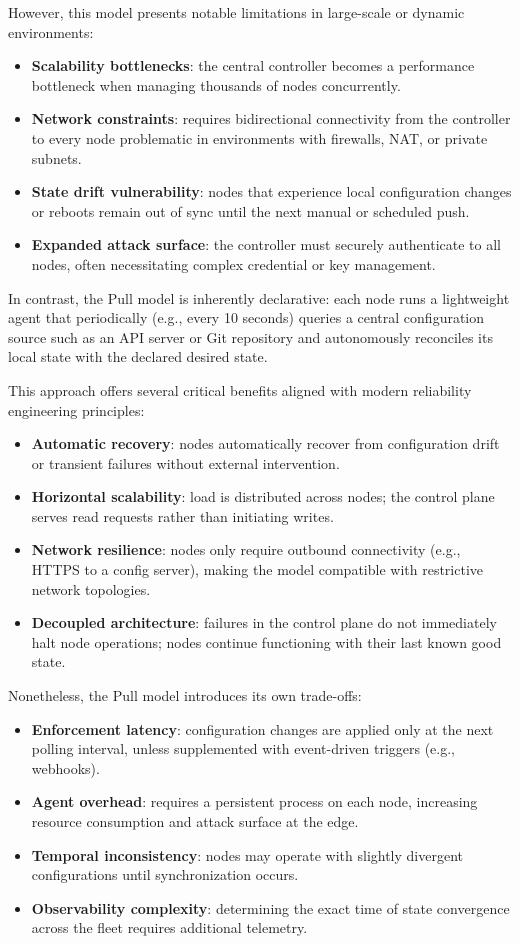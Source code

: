 However, this model presents notable limitations in large-scale or dynamic environments:
\begin{itemize}
\item \textbf{Scalability bottlenecks}: the central controller becomes a performance bottleneck when managing thousands of nodes concurrently.
\item \textbf{Network constraints}: requires bidirectional connectivity from the controller to every node problematic in environments with firewalls, NAT, or private subnets.
\item \textbf{State drift vulnerability}: nodes that experience local configuration changes or reboots remain out of sync until the next manual or scheduled push.
\item \textbf{Expanded attack surface}: the controller must securely authenticate to all nodes, often necessitating complex credential or key management.
\end{itemize}

In contrast, the Pull model is inherently declarative: each node runs a lightweight agent that periodically (e.g., every 10 seconds) queries a central configuration source such as an API server or Git repository and autonomously reconciles its local state with the declared desired state.

This approach offers several critical benefits aligned with modern reliability engineering principles:
\begin{itemize}
    \item \textbf{Automatic recovery}: nodes automatically recover from configuration drift or transient failures without external intervention.
    \item \textbf{Horizontal scalability}: load is distributed across nodes; the control plane serves read requests rather than initiating writes.
    \item \textbf{Network resilience}: nodes only require outbound connectivity (e.g., HTTPS to a config server), making the model compatible with restrictive network topologies.
    \item \textbf{Decoupled architecture}: failures in the control plane do not immediately halt node operations; nodes continue functioning with their last known good state.
\end{itemize}

Nonetheless, the Pull model introduces its own trade-offs:
\begin{itemize}
    \item \textbf{Enforcement latency}: configuration changes are applied only at the next polling interval, unless supplemented with event-driven triggers (e.g., webhooks).
    \item \textbf{Agent overhead}: requires a persistent process on each node, increasing resource consumption and attack surface at the edge.
    \item \textbf{Temporal inconsistency}: nodes may operate with slightly divergent configurations until synchronization occurs.
    \item \textbf{Observability complexity}: determining the exact time of state convergence across the fleet requires additional telemetry.
\end{itemize}

